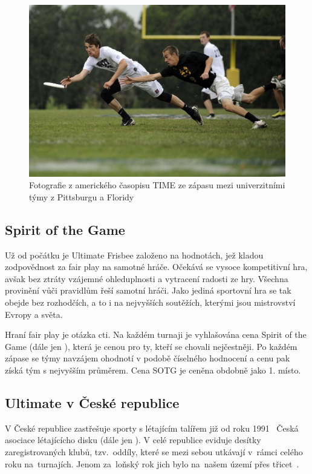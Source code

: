 \begin{figure}[ht!]
  \centering
  \includegraphics[width=130mm]{./images/ultimate-frisbee.jpg}
  \caption{Fotografie z amerického časopisu TIME ze zápasu mezi
    univerzitními týmy z Pittsburgu a Floridy~\cite{ultimate_time}\label{overflow}
    }
\end{figure}

\subsection{Spirit of the Game}

Už od počátku je Ultimate Frisbee založeno na hodnotách, jež kladou zodpovědnost za fair play na samotné hráče.
Očekává se vysoce kompetitivní hra, avšak bez ztráty vzájemné ohleduplnosti a vytracení radosti ze hry.
Všechna provinění vůči pravidlům řeší samotní hráči. Jako jediná sportovní hra se tak obejde bez rozhodčích, a to i
na nejvyšších soutěžích, kterými jsou mistrovství Evropy a světa.

Hraní fair play je otázka cti. Na každém turnaji je vyhlašována cena Spirit of the Game (dále jen ),
která je cenou pro ty, kteří se chovali nejčestněji. Po každém zápase se týmy navzájem ohodnotí
v podobě číselného hodnocení a cenu pak získá tým s nejvyšším průměrem. Cena SOTG
je ceněna obdobně jako 1. místo.

\subsection{Ultimate v České republice}

V České republice zastřešuje sporty s létajícím talířem již od roku 1991~\cite{cald_historie} Česká asociace
lé\-ta\-jícícho disku (dále jen ). V celé republice eviduje desítky zaregistrovaných
klubů, tzv.~oddíly, které se mezi sebou utkávají v~rámci celého roku na~turnajích.
Jenom za~loňský rok jich bylo na~našem území přes třicet~\cite{cald_kalendar}.

